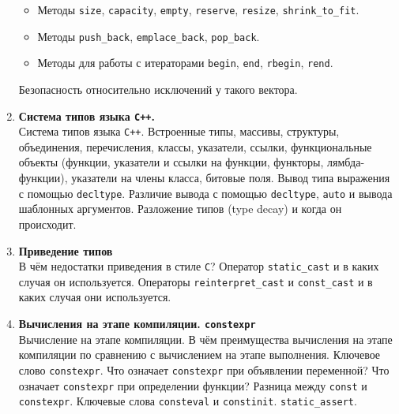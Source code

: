 \documentclass{article}
\begin{document}
\begin{enumerate}
\begin{itemize}
\item Методы \texttt{size}, \texttt{capacity}, \texttt{empty}, \texttt{reserve}, \texttt{resize}, \texttt{shrink\_to\_fit}.
\item Методы \texttt{push\_back}, \texttt{emplace\_back}, \texttt{pop\_back}.

\item Методы для работы с итераторами \texttt{begin}, \texttt{end}, \texttt{rbegin}, \texttt{rend}.
\end{itemize}

Безопасность относительно исключений у такого вектора.




\item \textbf{Система типов языка \texttt{C++}.}\\
Система типов языка \texttt{C++}. Встроенные типы, массивы, структуры, объединения, перечисления, классы, указатели, ссылки, функциональные объекты (функции, указатели и ссылки на функции, функторы, лямбда-функции), указатели на члены класса, битовые поля. Вывод типа выражения с помощью \texttt{decltype}. Различие вывода с помощью \texttt{decltype}, \texttt{auto} и вывода шаблонных аргументов. Разложение типов (type decay) и когда он происходит.


\item \textbf{Приведение типов}\\
В чём недостатки приведения в стиле \texttt{C}? Оператор \texttt{static\_cast} и в каких случая он используется. Операторы \texttt{reinterpret\_cast} и \texttt{const\_cast} и в каких случая они используется. 



\item \textbf{Вычисления на этапе компиляции. \texttt{constexpr}} \\
Вычисление на этапе компиляции. В чём преимущества вычисления на этапе компиляции по сравнению с вычислением на этапе выполнения.  Ключевое слово \texttt{constexpr}. Что означает \texttt{constexpr} при объявлении переменной? Что означает \texttt{constexpr} при определении функции? Разница между \texttt{const} и \texttt{constexpr}. Ключевые слова \texttt{consteval} и \texttt{constinit}. \texttt{static\_assert}.


\end{enumerate}
\end{document}

